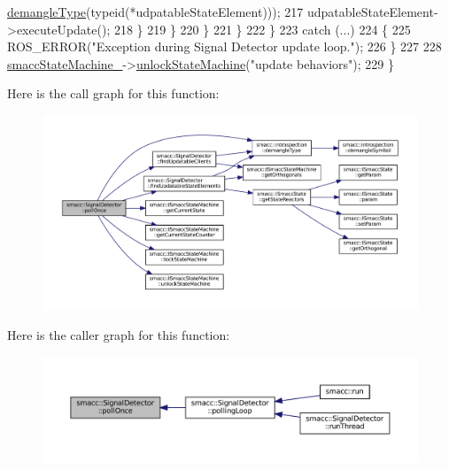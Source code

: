 \begin{DoxyCode}
      \hyperlink{namespacesmacc_1_1introspection_a670e39ccea29952859df4e2d0e45077b}{demangleType}(\textcolor{keyword}{typeid}(*udpatableStateElement)));
217                             udpatableStateElement->executeUpdate();
218                         \}
219                     \}
220                 \}
221             \}
222         \}
223         \textcolor{keywordflow}{catch} (...)
224         \{
225             ROS\_ERROR(\textcolor{stringliteral}{"Exception during Signal Detector update loop."});
226         \}
227 
228         \hyperlink{classsmacc_1_1SignalDetector_a46025de6ac7b5980e22144f9703236a4}{smaccStateMachine\_}->\hyperlink{classsmacc_1_1ISmaccStateMachine_ae2e3ceb87bfe3f9d8bf320e36071fdc7}{unlockStateMachine}(\textcolor{stringliteral}{"update behaviors"});
229     \}
\end{DoxyCode}
Here is the call graph for this function\+:
\nopagebreak
\begin{figure}[H]
\begin{center}
\leavevmode
\includegraphics[width=350pt]{classsmacc_1_1SignalDetector_a9a116479e23259f3a5d5d4a47278afd5_cgraph}
\end{center}
\end{figure}
Here is the caller graph for this function\+:
\nopagebreak
\begin{figure}[H]
\begin{center}
\leavevmode
\includegraphics[width=350pt]{classsmacc_1_1SignalDetector_a9a116479e23259f3a5d5d4a47278afd5_icgraph}
\end{center}
\end{figure}
\mbox{\label{classsmacc_1_1SignalDetector_a6ab99d99cef8d101e39797a72daeb2b7}} 
